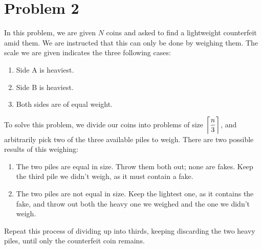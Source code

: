 \section*{Problem 2}

In this problem, we are given $N$ coins and asked to find a lightweight counterfeit amid them. We are instructed that this can only be done by weighing them. The scale we are given indicates the three following cases:
\begin{enumerate}
    \item Side A is heaviest.
    \item Side B is heaviest.
    \item Both sides are of equal weight.
\end{enumerate}

To solve this problem, we divide our coins into problems of size $\ceil[\bigg]{\dfrac{n}{3}}$, and arbitrarily pick two of the three available piles to weigh. There are two possible results of this weighing:
\begin{enumerate}
    \item The two piles are equal in size. Throw them both out; none are fakes. Keep the third pile we didn't weigh, as it must contain a fake.
    \item The two piles are not equal in size. Keep the lightest one, as it contains the fake, and throw out both the heavy one we weighed and the one we didn't weigh.
\end{enumerate}
Repeat this process of dividing up into thirds, keeping discarding the two heavy piles, until only the counterfeit coin remains.